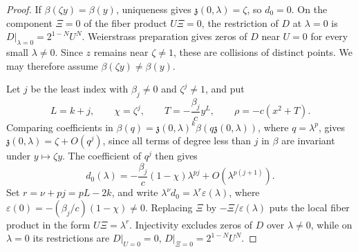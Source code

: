\documentclass[11pt,letterpaper]{article}
\numberwithin{equation}{section}
\theoremstyle{remark}
\theoremstyle{plain}
\begin{document}
\begin{proof}
If $\beta(\zeta y)=\beta(y)$, uniqueness gives
$\mathfrak z(0,\lambda)=\zeta$, so $d_0=0$.
On the component $\Xi=0$ of the fiber product $U\Xi=0$,
the restriction of $D$ at $\lambda=0$ is
$D|_{\lambda=0}=2^{1-N}U^N$.  Weierstrass preparation
\cite[Theorem~I.1.6]{GreuelLossenShustin} gives zeros of $D$ near
$U=0$ for every small $\lambda\neq0$.  Since $z$ remains near
$\zeta\neq1$, these are collisions of distinct points.
We may therefore assume $\beta(\zeta y)\neq\beta(y)$.

Let $j$ be the least index with $\beta_j\neq0$ and $\zeta^j\neq1$,
and put
\[
 L=k+j,\qquad \chi=\zeta^j,\qquad
 T=-\frac{\beta_j}{c}y^L,\qquad \rho=-c(x^2+T).
\]
Comparing coefficients in
$\beta(q)=\mathfrak z(0,\lambda)^k\beta(q\mathfrak z(0,\lambda))$,
where $q=\lambda^p$, gives
$\mathfrak z(0,\lambda)=\zeta+O(q^j)$, since all terms of degree
less than $j$ in $\beta$ are invariant under $y\mapsto\zeta y$.
The coefficient of $q^j$ then gives
\begin{equation}
 d_0(\lambda)=-\frac{\beta_j}{c}(1-\chi)\lambda^{pj}
            +O(\lambda^{p(j+1)}).                    \label{eq:d2-cyc-smoothing}
\end{equation}
Set $r=\nu+pj=pL-2k$, and write
$\lambda^\nu d_0=\lambda^r\varepsilon(\lambda)$, where
$\varepsilon(0)=-(\beta_j/c)(1-\chi)\neq0$.
Replacing $\Xi$ by $-\Xi/\varepsilon(\lambda)$ puts the local fiber
product in the form $U\Xi=\lambda^r$.
Injectivity excludes zeros of $D$ over $\lambda\neq0$, while
on $\lambda=0$ its restrictions are
$D|_{U=0}=0$, $D|_{\Xi=0}=2^{1-N}U^N$.


\end{proof}
\end{document}
